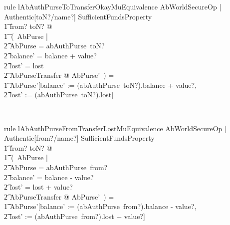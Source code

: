 \begin{LRRT}
\begin{theorem}{rule lAbAuthPurseToTransferOkayMuEquivalence}
    \forall  AbWorldSecureOp | Authentic[toN?/name?] \land SufficientFundsProperty \\
        \t1 \land from? \neq  toN? @ \\
        \t1\ (~\mu  \Delta AbPurse | \\
            \t2 \theta  AbPurse = abAuthPurse~toN? \land \\
            \t2 balance' = balance + value? \land  \\
            \t2 lost' = lost \land  \\
            \t2 \Xi AbPurseTransfer @ \theta  AbPurse'~) = \\
        \t1 \theta AbPurse'[balance' := (abAuthPurse~toN?).balance + value?, \\
            \t2 lost' := (abAuthPurse~toN?).lost]
\end{theorem}~\end{LRRT}

\begin{LRRT}
\begin{theorem}{rule lAbAuthPurseFromTransferLostMuEquivalence}
    \forall  AbWorldSecureOp | Authentic[from?/name?] \land  SufficientFundsProperty \\
        \t1 \land from? \neq  toN? @ \\
        \t1\ (~\mu  \Delta AbPurse | \\
            \t2 \theta AbPurse = abAuthPurse~from? \\
            \t2 \land balance' = balance - value? \\
            \t2 \land lost' = lost + value? \\
            \t2 \land \Xi AbPurseTransfer @ \theta AbPurse'~) = \\
        \t1 \theta AbPurse'[balance' := (abAuthPurse~from?).balance - value?, \\
            \t2 lost' := (abAuthPurse~from?).lost + value?]
\end{theorem}~\end{LRRT}


%
%

